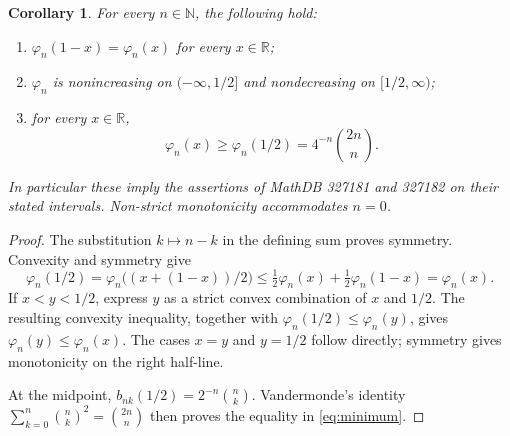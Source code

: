 \documentclass[11pt]{article}
\newtheorem{corollary}[theorem]{Corollary}
\newcommand{\R}{\mathbb R}
\newcommand{\N}{\mathbb N}
\newcommand{\ph}{\varphi}
\begin{document}
\begin{corollary}\label{cor:shape}
For every $n\in\N$, the following hold:
\begin{enumerate}
\item $\ph_n(1-x)=\ph_n(x)$ for every $x\in\R$;
\item $\ph_n$ is nonincreasing on $(-\infty,1/2]$ and nondecreasing
on $[1/2,\infty)$;
\item for every $x\in\R$,
\begin{equation}\label{eq:minimum}
 \ph_n(x)\geq\ph_n(1/2)=4^{-n}\binom{2n}{n}.
\end{equation}
\end{enumerate}
In particular these imply the assertions of MathDB 327181 and 327182
on their stated intervals. Non-strict monotonicity accommodates $n=0$.
\end{corollary}
\begin{proof}
The substitution $k\mapsto n-k$ in the defining sum proves symmetry.
Convexity and symmetry give
\[
 \ph_n(1/2)=\ph_n\bigl((x+(1-x))/2\bigr)
 \leq\tfrac12\ph_n(x)+\tfrac12\ph_n(1-x)=\ph_n(x).
\]
If $x<y<1/2$, express $y$ as a strict convex combination of $x$ and
$1/2$. The resulting convexity inequality, together with
$\ph_n(1/2)\leq\ph_n(y)$, gives $\ph_n(y)\leq\ph_n(x)$.
The cases $x=y$ and $y=1/2$ follow directly; symmetry gives monotonicity
on the right half-line.

At the midpoint, $b_{nk}(1/2)=2^{-n}\binom nk$. Vandermonde's identity
$\sum_{k=0}^n\binom nk^2=\binom{2n}{n}$ then proves the equality
in \eqref{eq:minimum}.
\end{proof}
\end{document}

